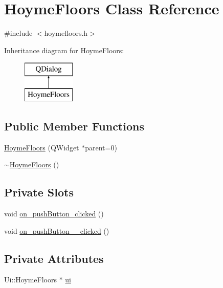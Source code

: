 \hypertarget{classHoymeFloors}{}\section{Hoyme\+Floors Class Reference}
\label{classHoymeFloors}


{\ttfamily \#include $<$hoymefloors.\+h$>$}

Inheritance diagram for Hoyme\+Floors\+:\begin{figure}[H]
\begin{center}
\leavevmode
\includegraphics[height=2.000000cm]{classHoymeFloors}
\end{center}
\end{figure}
\subsection*{Public Member Functions}
\begin{DoxyCompactItemize}
\item 
\hyperlink{classHoymeFloors_a708e4152c6f1de58b3d4c2b8cd1a2cac}{Hoyme\+Floors} (Q\+Widget $\ast$parent=0)
\item 
\hyperlink{classHoymeFloors_a22b8863dcc7cabf61e3a5f6221f9fc69}{$\sim$\+Hoyme\+Floors} ()
\end{DoxyCompactItemize}
\subsection*{Private Slots}
\begin{DoxyCompactItemize}
\item 
void \hyperlink{classHoymeFloors_ab07d53faecc2b6d9afa20ce673bbfeb8}{on\+\_\+push\+Button\+\_\+clicked} ()
\item 
void \hyperlink{classHoymeFloors_a2c34701acc5383216634845ee813dcf9}{on\+\_\+push\+Button\+\_\+\_\+clicked} ()
\end{DoxyCompactItemize}
\subsection*{Private Attributes}
\begin{DoxyCompactItemize}
\item 
Ui\+::\+Hoyme\+Floors $\ast$ \hyperlink{classHoymeFloors_ade5233dfacee00a835b2be807e2ec239}{ui}
\end{DoxyCompactItemize}


